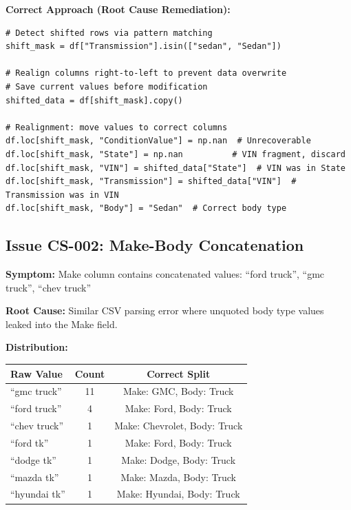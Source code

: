 \documentclass[12pt,a4paper]{article}
\begin{document}
\textbf{Correct Approach (Root Cause Remediation):}
\begin{lstlisting}
# Detect shifted rows via pattern matching
shift_mask = df["Transmission"].isin(["sedan", "Sedan"])

# Realign columns right-to-left to prevent data overwrite
# Save current values before modification
shifted_data = df[shift_mask].copy()

# Realignment: move values to correct columns
df.loc[shift_mask, "ConditionValue"] = np.nan  # Unrecoverable
df.loc[shift_mask, "State"] = np.nan          # VIN fragment, discard
df.loc[shift_mask, "VIN"] = shifted_data["State"]  # VIN was in State
df.loc[shift_mask, "Transmission"] = shifted_data["VIN"]  # Transmission was in VIN
df.loc[shift_mask, "Body"] = "Sedan"  # Correct body type
\end{lstlisting}

\subsection{Issue CS-002: Make-Body Concatenation}

\begin{issuebox}
\textbf{Symptom:} Make column contains concatenated values: ``ford truck'', ``gmc truck'', ``chev truck''

\textbf{Root Cause:} Similar CSV parsing error where unquoted body type values leaked into the Make field.

\textbf{Distribution:}
\begin{center}
\begin{tabular}{lcc}
\toprule
\textbf{Raw Value} & \textbf{Count} & \textbf{Correct Split} \\
\midrule
``gmc truck'' & 11 & Make: GMC, Body: Truck \\
``ford truck'' & 4 & Make: Ford, Body: Truck \\
``chev truck'' & 1 & Make: Chevrolet, Body: Truck \\
``ford tk'' & 1 & Make: Ford, Body: Truck \\
``dodge tk'' & 1 & Make: Dodge, Body: Truck \\
``mazda tk'' & 1 & Make: Mazda, Body: Truck \\
``hyundai tk'' & 1 & Make: Hyundai, Body: Truck \\
\bottomrule
\end{tabular}
\end{center}
\end{issuebox}
\end{document}
